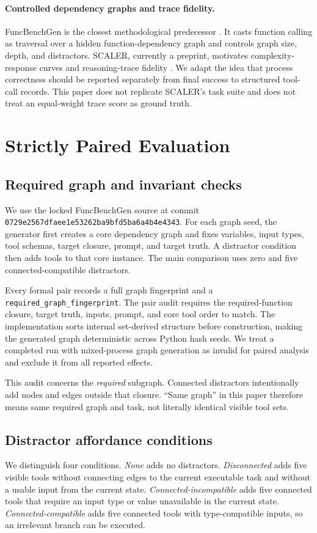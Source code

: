 \documentclass[twoside,11pt,preprint]{article}
\begin{document}
\paragraph{Controlled dependency graphs and trace fidelity.}
FuncBenchGen is the closest methodological predecessor
\citep{maekawa2025funcbenchgen}. It casts function calling as traversal over a
hidden function-dependency graph and controls graph size, depth, and distractors.
SCALER, currently a preprint, motivates complexity-response curves and
reasoning-trace fidelity \citep{ghajari2025scaler}. We adapt the idea that
process correctness should be reported separately from final success to
structured tool-call records. This paper does not replicate SCALER's task suite
and does not treat an equal-weight trace score as ground truth.

\section{Strictly Paired Evaluation}

\subsection{Required graph and invariant checks}
We use the locked FuncBenchGen source at commit
\texttt{0729e2567dfaee1e53262ba9bfd5ba6a4b4e4343}. For each graph seed, the
generator first creates a core dependency graph and fixes variables, input
types, tool schemas, target closure, prompt, and target truth. A distractor
condition then adds tools to that core instance. The main comparison uses zero
and five connected-compatible distractors.

Every formal pair records a full graph fingerprint and a
\texttt{required\_graph\_fingerprint}. The pair audit requires the
required-function closure, target truth, inputs, prompt, and core tool order to
match. The implementation sorts internal set-derived structure before
construction, making the generated graph deterministic across Python hash seeds.
We treat a completed run with mixed-process graph generation as invalid for
paired analysis and exclude it from all reported effects.

This audit concerns the \emph{required} subgraph. Connected distractors
intentionally add nodes and edges outside that closure. ``Same graph'' in this
paper therefore means same required graph and task, not literally identical
visible tool sets.

\subsection{Distractor affordance conditions}
We distinguish four conditions. \emph{None} adds no distractors.
\emph{Disconnected} adds five visible tools without connecting edges to the
current executable task and without a usable input from the current state.
\emph{Connected-incompatible} adds five connected tools that require an input
type or value unavailable in the current state. \emph{Connected-compatible}
adds five connected tools with type-compatible inputs, so an irrelevant branch
can be executed.
\end{document}
